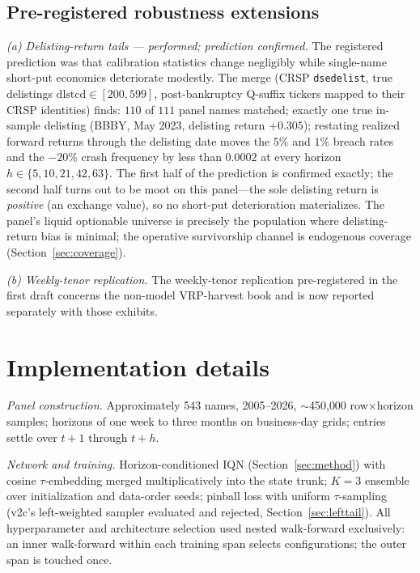 \documentclass[11pt]{article}
\begin{document}
\subsection{Pre-registered robustness extensions}\label{app:robust}
\emph{(a) Delisting-return tails --- performed; prediction confirmed.} The registered prediction was that calibration statistics change negligibly while single-name short-put economics deteriorate modestly. The merge (CRSP \texttt{dsedelist}, true delistings $\mathrm{dlstcd} \in [200,599]$, post-bankruptcy Q-suffix tickers mapped to their CRSP identities) finds: $110$ of $111$ panel names matched; exactly one true in-sample delisting (BBBY, May 2023, delisting return $+0.305$); restating realized forward returns through the delisting date moves the $5\%$ and $1\%$ breach rates and the $-20\%$ crash frequency by less than $0.0002$ at every horizon $h \in \{5,10,21,42,63\}$. The first half of the prediction is confirmed exactly; the second half turns out to be moot on this panel---the sole delisting return is \emph{positive} (an exchange value), so no short-put deterioration materializes. The panel's liquid optionable universe is precisely the population where delisting-return bias is minimal; the operative survivorship channel is endogenous coverage (Section~\ref{sec:coverage}).

\emph{(b) Weekly-tenor replication.} The weekly-tenor replication pre-registered in the first draft concerns the non-model VRP-harvest book and is now reported separately with those exhibits.

\section{Implementation details}\label{app:implementation}

\emph{Panel construction.} Approximately 543 names, 2005--2026, $\sim$450{,}000 row$\times$horizon samples; horizons of one week to three months on business-day grids; entries settle over $t{+}1$ through $t{+}h$.

\emph{Network and training.} Horizon-conditioned IQN (Section~\ref{sec:method}) with cosine $\tau$-embedding merged multiplicatively into the state trunk; $K=3$ ensemble over initialization and data-order seeds; pinball loss with uniform $\tau$-sampling (v2c's left-weighted sampler evaluated and rejected, Section~\ref{sec:lefttail}). All hyperparameter and architecture selection used nested walk-forward exclusively: an inner walk-forward within each training span selects configurations; the outer span is touched once.
\end{document}
